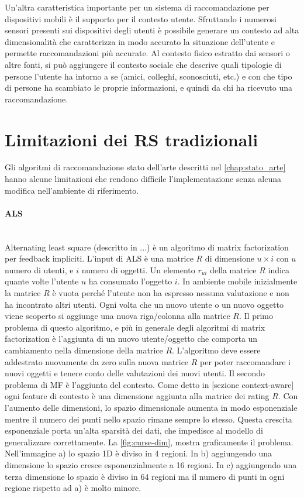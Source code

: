 \documentclass[12pt,italian]{report}
\newcommand{\myparagraph}[1]{\paragraph{#1}\mbox{}\\}
\begin{document}
Un'altra caratteristica importante per un sistema di raccomandazione per dispositivi mobili è il supporto per il contesto utente. Sfruttando i numerosi sensori presenti sui dispositivi degli utenti è possibile generare un contesto ad alta dimensionalità che caratterizza in modo accurato la situazione dell'utente e permette raccomandazioni più accurate. Al contesto fisico estratto dai sensori o altre fonti, si può aggiungere il contesto sociale che descrive quali tipologie di persone l'utente ha intorno a se (amici, colleghi, sconosciuti, etc.) e con che tipo di persone ha scambiato le proprie informazioni, e quindi da chi ha ricevuto una raccomandazione.

\section{Limitazioni dei RS tradizionali}
Gli algoritmi di raccomandazione stato dell'arte descritti nel \autoref{chap:stato_arte} hanno alcune limitazioni che rendono difficile l'implementazione senza alcuna modifica nell'ambiente di riferimento.

\myparagraph{ALS}
Alternating least square (descritto in ...) è un algoritmo di matrix factorization per feedback impliciti. L'input di ALS è una matrice $R$ di dimensione $u \times i$ con $u$ numero di utenti, e $i$ numero di oggetti. Un elemento $r_{ui}$ della matrice $R$ indica quante volte l'utente $u$ ha consumato l'oggetto $i$. In ambiente mobile inizialmente la matrice $R$ è vuota perché l'utente non ha espresso nessuna valutazione e non ha incontrato altri utenti. Ogni volta che un nuovo utente o un nuovo oggetto viene scoperto si aggiunge una nuova riga/colonna alla matrice $R$. Il primo problema di questo algoritmo, e più in generale degli algoritmi di matrix factorization è l'aggiunta di un nuovo utente/oggetto che comporta un cambiamento nella dimensione della matrice $R$. L'algoritmo deve essere addestrato nuovamente da zero sulla nuova matrice $R$ per poter raccomandare i nuovi oggetti e tenere conto delle valutazioni dei nuovi utenti. Il secondo problema di MF è l'aggiunta del contesto. Come detto in [sezione context-aware] ogni feature di contesto è una dimensione aggiunta alla matrice dei rating $R$. Con l'aumento delle dimensioni, lo spazio dimensionale aumenta in modo esponenziale \cite{curse-of-dim} mentre il numero dei punti nello spazio rimane sempre lo stesso. Questa crescita esponenziale porta un'alta sparsità dei dati, che impedisce al modello di generalizzare correttamente. La \autoref{fig:curse-dim}, mostra graficamente il problema. Nell'immagine a) lo spazio 1D è diviso in 4 regioni. In b) aggiungendo una dimensione lo spazio cresce esponenzialmente a 16 regioni. In c) aggiungendo una terza dimensione lo spazio è diviso in 64 regioni ma il numero di punti in ogni regione rispetto ad a) è molto minore.
\end{document}
